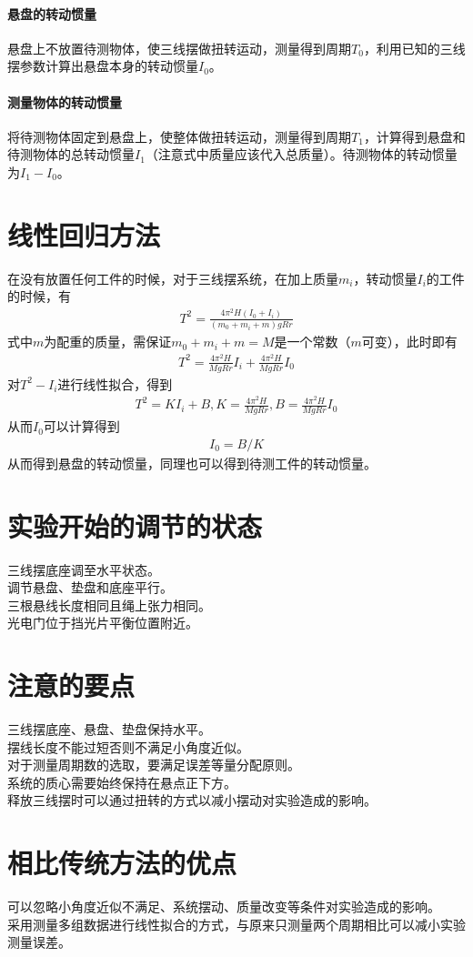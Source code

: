 \documentclass{ctexart}
\begin{document}
	\paragraph{悬盘的转动惯量}悬盘上不放置待测物体，使三线摆做扭转运动，测量得到周期$T_0$，利用已知的三线摆参数计算出悬盘本身的转动惯量$I_0$。
	\paragraph{测量物体的转动惯量}将待测物体固定到悬盘上，使整体做扭转运动，测量得到周期$T_1$，计算得到悬盘和待测物体的总转动惯量$I_1$（注意式中质量应该代入总质量）。待测物体的转动惯量为$I_1-I_0$。
	\section{线性回归方法}
	在没有放置任何工件的时候，对于三线摆系统，在加上质量$m_i$，转动惯量$I_i$的工件的时候，有
	\begin{align}
		T^2=\frac{4\pi^2H(I_0+I_i)}{(m_0+m_i+m)gRr}
	\end{align}
	式中$m$为配重的质量，需保证$m_0+m_i+m=M$是一个常数（$m$可变），此时即有
	\begin{align}
		T^2=\frac{4\pi^2H}{MgRr}I_i+\frac{4\pi^2H}{MgRr}I_0
	\end{align}
	对$T^2-I_i$进行线性拟合，得到
	\begin{align}
		T^2=KI_i+B,K=\frac{4\pi^2H}{MgRr},B=\frac{4\pi^2H}{MgRr}I_0
	\end{align}
	从而$I_0$可以计算得到
	\begin{align}
		I_0=B/K
	\end{align}
	从而得到悬盘的转动惯量，同理也可以得到待测工件的转动惯量。
	\section{实验开始的调节的状态}
	\noindent 三线摆底座调至水平状态。\\
	调节悬盘、垫盘和底座平行。\\
	三根悬线长度相同且绳上张力相同。\\
	光电门位于挡光片平衡位置附近。
	\section{注意的要点}
	\noindent 三线摆底座、悬盘、垫盘保持水平。\\
	摆线长度不能过短否则不满足小角度近似。\\
	对于测量周期数的选取，要满足误差等量分配原则。\\
	系统的质心需要始终保持在悬点正下方。\\
	释放三线摆时可以通过扭转的方式以减小摆动对实验造成的影响。
	\section{相比传统方法的优点}
	\noindent 可以忽略小角度近似不满足、系统摆动、质量改变等条件对实验造成的影响。\\
	采用测量多组数据进行线性拟合的方式，与原来只测量两个周期相比可以减小实验测量误差。
\end{document}
